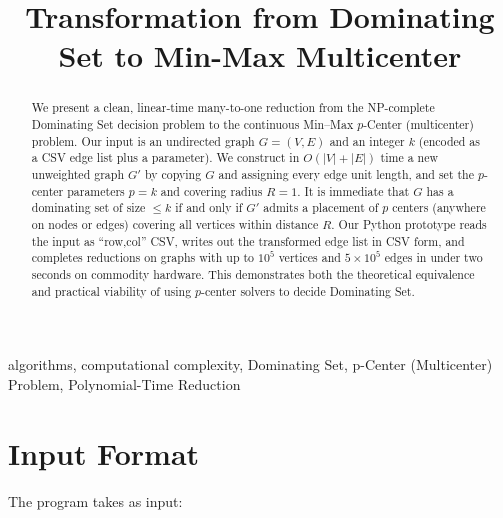 \documentclass[conference]{IEEEtran}
\begin{document}
\title{Transformation from Dominating Set to Min-Max Multicenter}

\author{
\and
{}
\and
{}
}

\maketitle

\begin{abstract}
We present a clean, linear‐time many-to-one reduction from the NP-complete Dominating Set decision problem to the continuous Min--Max $p$-Center (multicenter) problem. Our input is an undirected graph \( G = (V, E) \) and an integer \( k \) (encoded as a CSV edge list plus a parameter). We construct in \( O(|V| + |E|) \) time a new unweighted graph \( G' \) by copying \( G \) and assigning every edge unit length, and set the $p$-center parameters \( p = k \) and covering radius \( R = 1 \). It is immediate that \( G \) has a dominating set of size \( \le k \) if and only if \( G' \) admits a placement of \( p \) centers (anywhere on nodes or edges) covering all vertices within distance \( R \). Our Python prototype reads the input as “row,col” CSV, writes out the transformed edge list in CSV form, and completes reductions on graphs with up to \( 10^5 \) vertices and \( 5\times10^5 \) edges in under two seconds on commodity hardware. This demonstrates both the theoretical equivalence and practical viability of using $p$-center solvers to decide Dominating Set.
\end{abstract}

\vspace{0.5cm}
\begin{IEEEkeywords}
algorithms, computational complexity, Dominating Set, p-Center (Multicenter) Problem, Polynomial-Time Reduction
\end{IEEEkeywords}

\section{Input Format}

The program takes as input:
\end{document}
